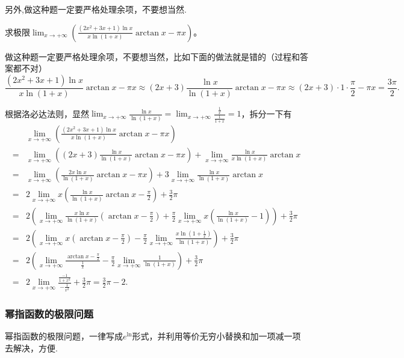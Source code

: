 \documentclass[../../main.tex]{subfiles}
\begin{document}
\begin{remark}
另外,做这种题一定要严格处理余项，不要想当然.
\end{remark}
\begin{example}
求极限\(\lim_{x\rightarrow +\infty}\left(\frac{(2x^2 + 3x + 1)\ln x}{x\ln(1 + x)}\arctan x-\pi x\right)\)。
\end{example}
\begin{remark}
做这种题一定要严格处理余项，不要想当然，比如下面的做法就是错的（过程和答案都不对）
\[\frac{(2x^2 + 3x + 1)\ln x}{x\ln(1 + x)}\arctan x-\pi x\approx(2x + 3)\frac{\ln x}{\ln(1 + x)}\arctan x-\pi x\approx(2x + 3)\cdot1\cdot\frac{\pi}{2}-\pi x=\frac{3\pi}{2}.\]
\end{remark}
\begin{solution}
根据洛必达法则，显然\(\lim_{x\rightarrow +\infty}\frac{\ln x}{\ln(1 + x)}=\lim_{x\rightarrow +\infty}\frac{\frac{1}{x}}{\frac{1}{1 + x}} = 1\)，拆分一下有
\begin{align*}
&\lim_{x\rightarrow +\infty}\left(\frac{(2x^2 + 3x + 1)\ln x}{x\ln(1 + x)}\arctan x-\pi x\right)\\
=&\lim_{x\rightarrow +\infty}\left((2x + 3)\frac{\ln x}{\ln(1 + x)}\arctan x-\pi x\right)+\lim_{x\rightarrow +\infty}\frac{\ln x}{x\ln(1 + x)}\arctan x\\
=&\lim_{x\rightarrow +\infty}\left(\frac{2x\ln x}{\ln(1 + x)}\arctan x-\pi x\right)+3\lim_{x\rightarrow +\infty}\frac{\ln x}{\ln(1 + x)}\arctan x\\
=&2\lim_{x\rightarrow +\infty}x\left(\frac{\ln x}{\ln(1 + x)}\arctan x-\frac{\pi}{2}\right)+\frac{3}{2}\pi\\
=&2\left(\lim_{x\rightarrow +\infty}\frac{x\ln x}{\ln(1 + x)}\left(\arctan x-\frac{\pi}{2}\right)+\frac{\pi}{2}\lim_{x\rightarrow +\infty}x\left(\frac{\ln x}{\ln(1 + x)}-1\right)\right)+\frac{3}{2}\pi\\
=&2\left(\lim_{x\rightarrow +\infty}x\left(\arctan x-\frac{\pi}{2}\right)-\frac{\pi}{2}\lim_{x\rightarrow +\infty}\frac{x\ln(1 + \frac{1}{x})}{\ln(1 + x)}\right)+\frac{3}{2}\pi\\
=&2\left(\lim_{x\rightarrow +\infty}\frac{\arctan x-\frac{\pi}{2}}{\frac{1}{x}}-\frac{\pi}{2}\lim_{x\rightarrow +\infty}\frac{1}{\ln(1 + x)}\right)+\frac{3}{2}\pi\\
=&2\lim_{x\rightarrow +\infty}\frac{\frac{-1}{1 + x^2}}{-\frac{1}{x^2}}+\frac{3}{2}\pi=\frac{3}{2}\pi - 2.
\end{align*}
\end{solution}

\subsubsection{幂指函数的极限问题}
幂指函数的极限问题，一律写成\(e^{\ln}\)形式，并利用等价无穷小替换和加一项减一项去解决，方便.
\end{document}
